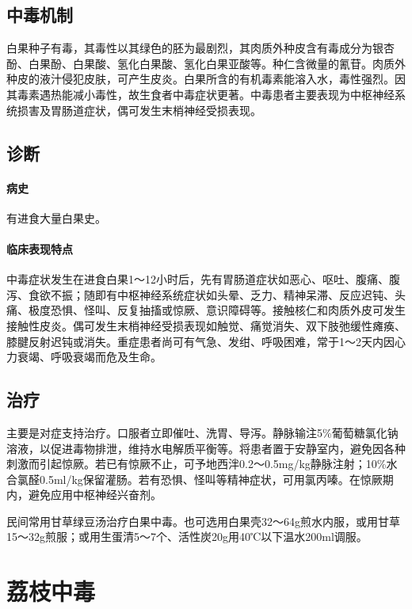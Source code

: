 \subsection{中毒机制}

白果种子有毒，其毒性以其绿色的胚为最剧烈，其肉质外种皮含有毒成分为银杏酚、白果酚、白果酸、氢化白果酸、氢化白果亚酸等。种仁含微量的氰苷。肉质外种皮的液汁侵犯皮肤，可产生皮炎。白果所含的有机毒素能溶入水，毒性强烈。因其毒素遇热能减小毒性，故生食者中毒症状更著。中毒患者主要表现为中枢神经系统损害及胃肠道症状，偶可发生末梢神经受损表现。

\subsection{诊断}

\paragraph{病史}

有进食大量白果史。

\paragraph{临床表现特点}

中毒症状发生在进食白果1～12小时后，先有胃肠道症状如恶心、呕吐、腹痛、腹泻、食欲不振；随即有中枢神经系统症状如头晕、乏力、精神呆滞、反应迟钝、头痛、极度恐惧、怪叫、反复抽搐或惊厥、意识障碍等。接触核仁和肉质外皮可发生接触性皮炎。偶可发生末梢神经受损表现如触觉、痛觉消失、双下肢弛缓性瘫痪、膝腱反射迟钝或消失。重症患者尚可有气急、发绀、呼吸困难，常于1～2天内因心力衰竭、呼吸衰竭而危及生命。

\subsection{治疗}

主要是对症支持治疗。口服者立即催吐、洗胃、导泻。静脉输注5\%葡萄糖氯化钠溶液，以促进毒物排泄，维持水电解质平衡等。将患者置于安静室内，避免因各种刺激而引起惊厥。若已有惊厥不止，可予地西泮0.2～0.5mg/kg静脉注射；10\%水合氯醛0.5ml/kg保留灌肠。若有恐惧、怪叫等精神症状，可用氯丙嗪。在惊厥期内，避免应用中枢神经兴奋剂。

民间常用甘草绿豆汤治疗白果中毒。也可选用白果壳32～64g煎水内服，或用甘草15～32g煎服；或用生蛋清5～7个、活性炭20g用40℃以下温水200ml调服。

\protect\hypertarget{text00169.html}{}{}

\section{荔枝中毒}

